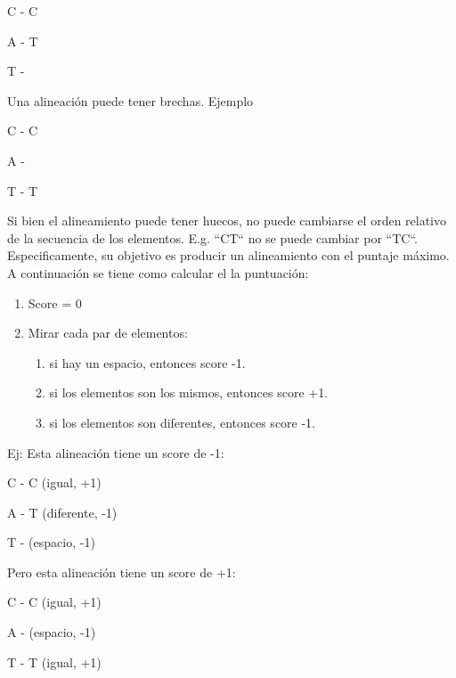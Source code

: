 \documentclass[usenatbib]{tjaa}
\begin{document}
    C - C
    
    A - T
    
    T -

\vspace{1em}

Una alineación puede tener brechas. Ejemplo
\vspace{1em}

C - C

A -

T - T

\vspace{1em}

Si bien el alineamiento puede tener huecos, no puede cambiarse el orden relativo de la secuencia de los elementos. E.g. ``CT`` no se puede cambiar por  ``TC``. Especificamente, su objetivo es producir un alineamiento con el puntaje máximo. A continuación se tiene como calcular el la puntuación:

\vspace{0.5em}
\begin{enumerate}
    \item Score = 0
    \item Mirar cada par de elementos: \begin{enumerate}
        \item si hay un espacio, entonces score -1.
        \item si los elementos son los mismos, entonces score +1.
        \item si los elementos son diferentes, entonces score -1.
    \end{enumerate}
\end{enumerate}



Ej: Esta alineación tiene un score de -1:

\vspace{1em}

C - C (igual, +1)

A - T (diferente, -1)

T -   (espacio, -1)

\vspace{1em}

Pero esta alineación tiene un score de +1:

\vspace{1em}

C - C   (igual, +1)

A -     (espacio, -1)

T - T   (igual, +1)

\vspace{1em}
\end{document}
